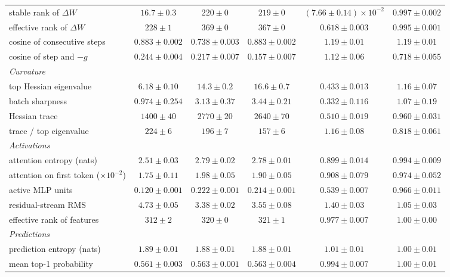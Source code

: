 \begin{center}
\begin{minipage}{\linewidth}
\begin{tabular}{@{}l|ccc|cc@{}}
stable rank of $\Delta W$ & $16.7 \pm 0.3$ & $220 \pm 0$ & $219 \pm 0$ & {\boldmath\textbf{$(7.66 \pm 0.14){\times}10^{-2}$}} & $0.997 \pm 0.002$ \\
effective rank of $\Delta W$ & $228 \pm 1$ & $369 \pm 0$ & $367 \pm 0$ & $0.618 \pm 0.003$ & $0.995 \pm 0.001$ \\
cosine of consecutive steps & $0.883 \pm 0.002$ & $0.738 \pm 0.003$ & $0.883 \pm 0.002$ & $1.19 \pm 0.01$ & {\boldmath\textbf{$1.19 \pm 0.01$}} \\
cosine of step and $-g$ & $0.244 \pm 0.004$ & $0.217 \pm 0.007$ & $0.157 \pm 0.007$ & $1.12 \pm 0.06$ & {\boldmath\textbf{$0.718 \pm 0.055$}} \\
\emph{Curvature} & & & & & \\
top Hessian eigenvalue & $6.18 \pm 0.10$ & $14.3 \pm 0.2$ & $16.6 \pm 0.7$ & {\boldmath\textbf{$0.433 \pm 0.013$}} & {\boldmath\textbf{$1.16 \pm 0.07$}} \\
batch sharpness & $0.974 \pm 0.254$ & $3.13 \pm 0.37$ & $3.44 \pm 0.21$ & {\boldmath\textbf{$0.332 \pm 0.116$}} & $1.07 \pm 0.19$ \\
Hessian trace & $1400 \pm 40$ & $2770 \pm 20$ & $2640 \pm 70$ & $0.510 \pm 0.019$ & $0.960 \pm 0.031$ \\
trace / top eigenvalue & $224 \pm 6$ & $196 \pm 7$ & $157 \pm 6$ & $1.16 \pm 0.08$ & {\boldmath\textbf{$0.818 \pm 0.061$}} \\
\emph{Activations} & & & & & \\
attention entropy (nats) & $2.51 \pm 0.03$ & $2.79 \pm 0.02$ & $2.78 \pm 0.01$ & $0.899 \pm 0.014$ & $0.994 \pm 0.009$ \\
attention on first token ($\times10^{-2}$) & $1.75 \pm 0.11$ & $1.98 \pm 0.05$ & $1.90 \pm 0.05$ & $0.908 \pm 0.079$ & $0.974 \pm 0.052$ \\
active MLP units & $0.120 \pm 0.001$ & $0.222 \pm 0.001$ & $0.214 \pm 0.001$ & $0.539 \pm 0.007$ & $0.966 \pm 0.011$ \\
residual-stream RMS & $4.73 \pm 0.05$ & $3.38 \pm 0.02$ & $3.55 \pm 0.08$ & $1.40 \pm 0.03$ & $1.05 \pm 0.03$ \\
effective rank of features & $312 \pm 2$ & $320 \pm 0$ & $321 \pm 1$ & $0.977 \pm 0.007$ & $1.00 \pm 0.00$ \\
\emph{Predictions} & & & & & \\
prediction entropy (nats) & $1.89 \pm 0.01$ & $1.88 \pm 0.01$ & $1.88 \pm 0.01$ & $1.01 \pm 0.01$ & $1.00 \pm 0.01$ \\
mean top-1 probability & $0.561 \pm 0.003$ & $0.563 \pm 0.001$ & $0.563 \pm 0.004$ & $0.994 \pm 0.007$ & $1.00 \pm 0.01$ \\

\end{tabular}
\end{minipage}
\end{center}
